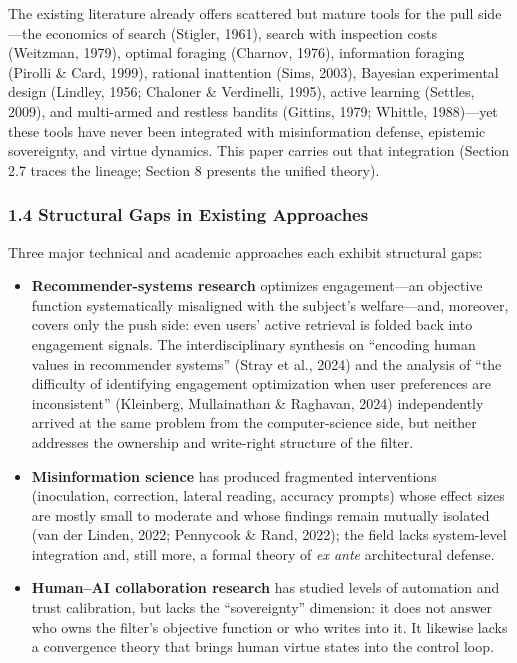 \documentclass[
  11pt]{article}
\providecommand{\tightlist}{%
  \setlength{\itemsep}{0pt}\setlength{\parskip}{0pt}}
\begin{document}
The existing literature already offers scattered but mature tools for
the pull side---the economics of search (Stigler, 1961), search with
inspection costs (Weitzman, 1979), optimal foraging (Charnov, 1976),
information foraging (Pirolli \& Card, 1999), rational inattention
(Sims, 2003), Bayesian experimental design (Lindley, 1956; Chaloner \&
Verdinelli, 1995), active learning (Settles, 2009), and multi-armed and
restless bandits (Gittins, 1979; Whittle, 1988)---yet these tools have
never been integrated with misinformation defense, epistemic
sovereignty, and virtue dynamics. This paper carries out that
integration (Section 2.7 traces the lineage; Section 8 presents the
unified theory).

\subsubsection{1.4 Structural Gaps in Existing
Approaches}\label{structural-gaps-in-existing-approaches}

Three major technical and academic approaches each exhibit structural
gaps:

\begin{itemize}
\tightlist
\item
  \textbf{Recommender-systems research} optimizes engagement---an
  objective function systematically misaligned with the subject's
  welfare---and, moreover, covers only the push side: even users' active
  retrieval is folded back into engagement signals. The
  interdisciplinary synthesis on ``encoding human values in recommender
  systems'' (Stray et al., 2024) and the analysis of ``the difficulty of
  identifying engagement optimization when user preferences are
  inconsistent'' (Kleinberg, Mullainathan \& Raghavan, 2024)
  independently arrived at the same problem from the computer-science
  side, but neither addresses the ownership and write-right structure of
  the filter.
\item
  \textbf{Misinformation science} has produced fragmented interventions
  (inoculation, correction, lateral reading, accuracy prompts) whose
  effect sizes are mostly small to moderate and whose findings remain
  mutually isolated (van der Linden, 2022; Pennycook \& Rand, 2022); the
  field lacks system-level integration and, still more, a formal theory
  of \emph{ex ante} architectural defense.
\item
  \textbf{Human--AI collaboration research} has studied levels of
  automation and trust calibration, but lacks the ``sovereignty''
  dimension: it does not answer who owns the filter's objective function
  or who writes into it. It likewise lacks a convergence theory that
  brings human virtue states into the control loop.
\end{itemize}
\end{document}
